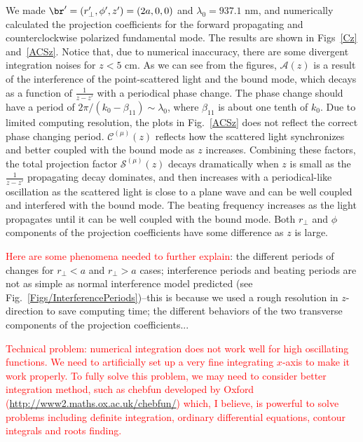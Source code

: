\documentclass[]{report}
\begin{document}
We made $ \br'=(r'_\perp,\phi',z')=(2a,0,0) $ and $ \lambda_0=937.1 $ nm, and numerically calculated the projection coefficients for the forward propagating and counterclockwise polarized fundamental mode. The results are shown in Figs~\ref{Cz} and~\ref{ACSz}. Notice that, due to numerical inaccuracy, there are some divergent integration noises for $ z<5 $ cm. As we can see from the figures, $ \mathcal{A}(z) $ is a result of the interference of the point-scattered light and the bound mode, which decays as a function of $ \frac{1}{z-z'} $ with a periodical phase change. The phase change should have a period of $ 2\pi/(k_0-\beta_{11})\sim \lambda_0 $, where $ \beta_{11} $ is about one tenth of $ k_0 $. Due to limited computing resolution, the plots in Fig.~\ref{ACSz} does not reflect the correct phase changing period. $ \mathcal{C}^{(\mu)}(z) $ reflects how the scattered light synchronizes and better coupled with the bound mode as $ z $ increases. Combining these factors, the total projection factor $ \mathcal{S}^{(\mu)}(z) $ decays dramatically when $ z $ is small as the $ \frac{1}{z-z'} $ propagating decay dominates, and then increases with a periodical-like oscillation as the scattered light is close to a plane wave and can be well coupled and interfered with the bound mode. The beating frequency increases as the light propagates until it can be well coupled with the bound mode. Both $ r_\perp $ and $ \phi $ components of the projection coefficients have some difference as $ z $ is large. 

\textcolor{red}{Here are some phenomena needed to further explain}: the different periods of changes for $ r_\perp< a $ and $ r_\perp>a $ cases; interference periods and beating periods are not as simple as normal interference model predicted (see Fig.~\ref{Figs/InterferencePeriods})--this is because we used a rough resolution in $ z $-direction to save computing time; the different behaviors of the two transverse components of the projection coefficients...

\textcolor{red}{Technical problem: numerical integration does not work well for high oscillating functions. We need to artificially set up a very fine integrating $ x $-axis to make it work properly. To fully solve this problem, we may need to consider better integration method, such as chebfun developed by Oxford (\url{http://www2.maths.ox.ac.uk/chebfun/}) which, I believe, is powerful to solve problems including definite integration, ordinary differential equations, contour integrals and roots finding. }
\end{document}
